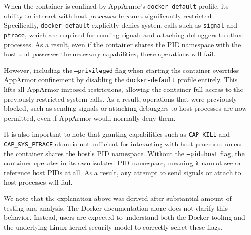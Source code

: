 When the container is confined by AppArmor's \texttt{docker-default} profile, its ability to interact with host processes becomes significantly restricted. Specifically, \texttt{docker-default} explicitly denies system calls such as \texttt{signal} and \texttt{ptrace}, which are required for sending signals and attaching debuggers to other processes. As a result, even if the container shares the PID namespace with the host and possesses the necessary capabilities, these operations will fail. 

However, including the \texttt{--privileged} flag when starting the container overrides AppArmor confinement by disabling the \texttt{docker-default} profile entirely. This lifts all AppArmor-imposed restrictions, allowing the container full access to the previously restricted system calls. As a result, operations that were previously blocked, such as sending signals or attaching debuggers to host processes are now permitted, even if AppArmor would normally deny them.

It is also important to note that granting capabilities such as \texttt{CAP\_KILL} and \texttt{CAP\_SYS\_PTRACE} alone is not sufficient for interacting with host processes unless the container shares the host’s PID namespace. Without the \texttt{--pid=host} flag, the container operates in its own isolated PID namespace, meaning it cannot see or reference host PIDs at all. As a result, any attempt to send signals or attach to host processes will fail.

We note that the explanation above was derived after substantial amount of testing and analysis. The Docker documentation alone does not clarify this behavior. Instead, users are expected to understand both the Docker tooling and the underlying Linux kernel security model to correctly select these flags. 


